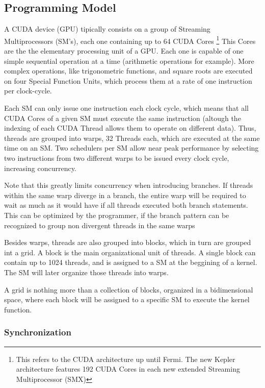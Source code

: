 \subsection{Programming Model}
\label{sec:cuda:model}

A CUDA device (GPU) tipically consists on a group of Streaming Multiprocessors (SM's), each one containing up to 64 CUDA Cores \footnote{This refers to the CUDA architecture up until Fermi. The new Kepler architecture features 192 CUDA Cores in each new extended Streaming Multiprocessor (SMX)}
This Cores are the the elementary processing unit of a GPU. Each one is capable of one simple sequential operation at a time (arithmetic operations for example). More complex operations, like trigonometric functions, and square roots are executed on four Special Function Units, which process them at a rate of one instruction per clock-cycle.

Each SM can only issue one instruction each clock cycle, which means that all CUDA Cores of a given SM must execute the same instruction (altough the indexing of each CUDA Thread allows them to operate on different data). Thus, threads are grouped into warps, 32 Threads each, which are executed at the same time on an SM. Two schedulers per SM allow near peak performance by selecting two instructions from two different warps to be issued every clock cycle, increasing concurrency.

Note that this greatly limits concurrency when introducing branches. If threads within the same warp diverge in a branch, the entire warp will be required to wait as much as it would have if all threads executed both branch statements. This can be optimized by the programmer, if the branch pattern can be recognized to group non divergent threads in the same warps

Besides warps, threads are also grouped into blocks, which in turn are grouped int a grid. A block is the main organizational unit of threads. A single block can contain up to 1024 threads, and is assigned to a SM at the beggining of a kernel. The SM will later organize those threads into warps.

A grid is nothing more than a collection of blocks, organized in a bidimensional space, where each block will be assigned to a specific SM to execute the kernel function.

\subsubsection{Synchronization}
\label{sec:cuda:model:sync}


